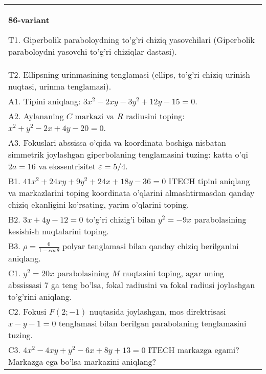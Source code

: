 \documentclass{article}
\begin{document}
\begin{tabular}{m{17cm}}
\textbf{86-variant}
\newline

T1. Giperbolik paraboloydning to'g'ri chiziq yasovchilari (Giperbolik paraboloydni yasovchi to'g'ri chiziqlar dastasi).\\

T2. Ellipsning urinmasining tenglamasi (ellips, to'g'ri chiziq urinish nuqtasi, urinma tenglamasi).\\

A1. Tipini aniqlang: $3x^{2}-2xy-3y^{2}+12y-15=0$.\\

A2. Aylananing $C$ markazi va $R$ radiusini toping: $x^2+y^2-2x+4y-20=0$.\\

A3. Fokuslari abssissa o'qida va koordinata boshiga nisbatan simmetrik joylashgan giperbolaning tenglamasini tuzing: katta o'qi $2a=16$ va ekssentrisitet $\varepsilon=5/4$.\\

B1. $41x^{2} + 24xy + 9y^{2} + 24x + 18y - 36 = 0$ ITECH tipini aniqlang va markazlarini toping koordinata o'qlarini almashtirmasdan qanday chiziq ekanligini ko'rsating, yarim o'qlarini toping.  \\

B2. $3x + 4y - 12 = 0$ to'g'ri chizig'i bilan $y^{2} = - 9x$ parabolasining kesishish nuqtalarini toping.  \\

B3. $\rho = \frac{6}{1 - cos\theta}$ polyar tenglamasi bilan qanday chiziq berilganini aniqlang.  \\

C1. $y^{2} = 20x$ parabolasining $M$ nuqtasini toping, agar uning abssissasi 7 ga teng bo'lsa, fokal radiusini va fokal radiusi joylashgan to'g'rini aniqlang.\\

C2. Fokusi $F(2; - 1)$ nuqtasida joylashgan, mos direktrisasi $x - y - 1 = 0$ tenglamasi bilan berilgan parabolaning tenglamasini tuzing.  \\

C3. $4x^{2} - 4xy + y^{2} - 6x + 8y + 13 = 0$ ITECH markazga egami? Markazga ega bo'lsa markazini aniqlang?  \\

\end{tabular}
\vspace{1cm}
\end{document}
